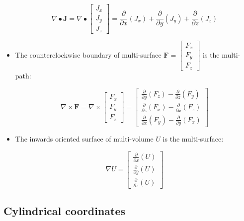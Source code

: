 \documentclass{book}
\begin{document}
\begin{itemize}
\[\nabla \bullet \mathbf{J} = \nabla \bullet \begin{bmatrix} J_x \\ J_y \\ J_z \end{bmatrix} = \frac{\partial}{\partial x}(J_x) + \frac{\partial}{\partial y}(J_y) + \frac{\partial}{\partial z}(J_z)\]
\item The counterclockwise boundary of multi-surface \(\mathbf{F} = \begin{bmatrix} F_x \\ F_y \\ F_z \end{bmatrix}\) is the multi-path:

\[\nabla \times \mathbf{F} = \nabla \times \begin{bmatrix} F_x \\ F_y \\ F_z \end{bmatrix} = \begin{bmatrix} \frac{\partial}{\partial y}(F_z) - \frac{\partial}{\partial z}(F_y) \\ \frac{\partial}{\partial z}(F_x) - \frac{\partial}{\partial x}(F_z) \\ \frac{\partial}{\partial x}(F_y) - \frac{\partial}{\partial y}(F_x) \end{bmatrix}\]
\item The inwards oriented surface of multi-volume \(U\) is the multi-surface:

\[\nabla U = \begin{bmatrix} \frac{\partial}{\partial x}(U) \\ \frac{\partial}{\partial y}(U) \\ \frac{\partial}{\partial z}(U) \end{bmatrix}\]
\end{itemize}




\subsection*{Cylindrical coordinates}
\end{document}
